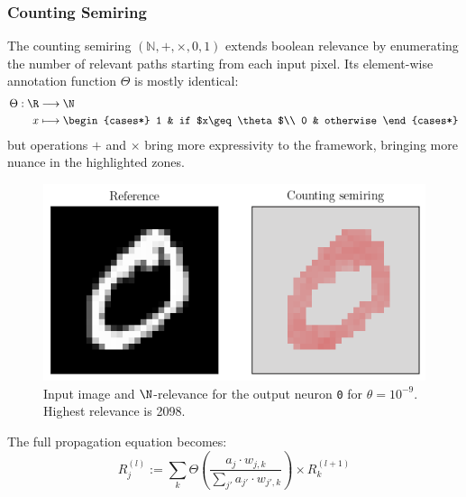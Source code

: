 \documentclass{../cs-classes/cs-classes}
\newcommand*{\1}{\digitsbb{1}}
\newcommand*{\0}{\digitsbb{0}}
\begin{document}
\subsubsection{Counting Semiring}
The counting semiring $(\mathbb{N}, +, \times, 0, 1)$ extends boolean relevance by enumerating the number of relevant paths starting from each input pixel. Its element-wise annotation function $\Theta$ is mostly identical:
\begin{equation}
    \begin{aligned}
        \Theta: \R&\longrightarrow\N\\
        x&\longmapsto \begin{cases*}
            1 & if $x\geq\theta$\\
            0 & otherwise
        \end{cases*}
    \end{aligned}
\end{equation}
but operations $+$ and $\times$ bring more expressivity to the framework, bringing more nuance in the highlighted zones.

\begin{figure}[H]
    \centering
    \includegraphics[width=.5\textwidth]{counting.png}
    \caption{Input image and $\N$-relevance for the output neuron \texttt{0} for $\theta=10^{-9}$.\\ Highest relevance is 2098.}
\end{figure}

The full propagation equation becomes:
\begin{equation}
    R^{(l)}_j := \sum_{k}\Theta\left(\frac{a_j\cdot w_{j, k}}{\sum_{j'}a_{j'}\cdot w_{j', k}}\right) \times R^{(l+1)}_k
    \label{eq:counting-lrp}
\end{equation}
\end{document}
